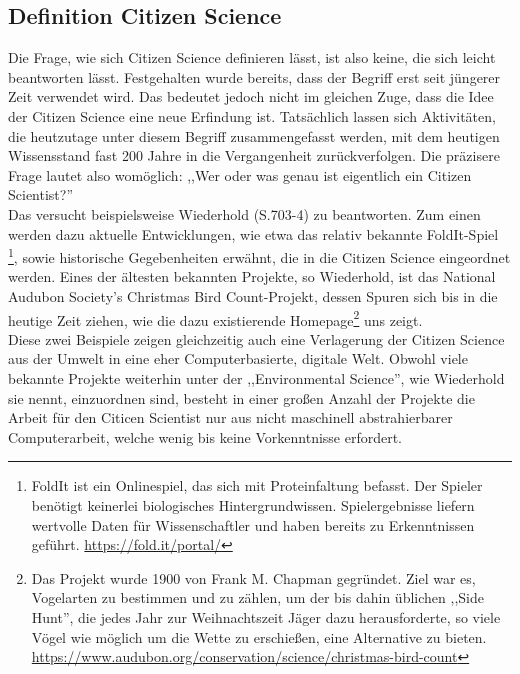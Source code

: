 \documentclass{article}
\begin{document}
\subsection{Definition Citizen Science}
Die Frage, wie sich Citizen Science definieren lässt, ist also keine, die sich leicht beantworten lässt. Festgehalten wurde bereits, dass der Begriff erst seit jüngerer Zeit verwendet wird. Das bedeutet jedoch nicht im gleichen Zuge, dass die Idee der Citizen Science eine neue Erfindung ist. Tatsächlich lassen sich Aktivitäten, die heutzutage unter diesem Begriff zusammengefasst werden, mit dem heutigen Wissensstand fast 200 Jahre in die Vergangenheit zurückverfolgen. Die präzisere Frage lautet also womöglich: ,,Wer oder was genau ist eigentlich ein Citizen Scientist?'' \\
Das versucht beispielsweise Wiederhold\cite{Wiederhold} (S.703-4) zu beantworten. Zum einen werden dazu aktuelle Entwicklungen, wie etwa das relativ bekannte FoldIt-Spiel \footnote{FoldIt ist ein Onlinespiel, das sich mit Proteinfaltung befasst. Der Spieler benötigt keinerlei biologisches Hintergrundwissen. Spielergebnisse liefern wertvolle Daten für Wissenschaftler und haben bereits zu Erkenntnissen geführt. \url{https://fold.it/portal/}}, sowie historische Gegebenheiten erwähnt, die in die Citizen Science eingeordnet werden. Eines der ältesten bekannten Projekte, so Wiederhold, ist das National Audubon Society's Christmas Bird Count-Projekt, dessen Spuren sich bis in die heutige Zeit ziehen, wie die dazu existierende Homepage\footnote{Das Projekt wurde 1900 von Frank M. Chapman gegründet. Ziel war es, Vogelarten zu bestimmen und zu zählen, um der bis dahin üblichen ,,Side Hunt'', die jedes Jahr zur Weihnachtszeit Jäger dazu herausforderte, so viele Vögel wie möglich um die Wette zu erschießen, eine Alternative zu bieten. \url{https://www.audubon.org/conservation/science/christmas-bird-count}} uns zeigt.\\
Diese zwei Beispiele zeigen gleichzeitig auch eine Verlagerung der Citizen Science aus der Umwelt in eine eher Computerbasierte, digitale Welt. Obwohl viele bekannte Projekte weiterhin unter der ,,Environmental Science'', wie Wiederhold sie nennt, einzuordnen sind, besteht in einer großen Anzahl der Projekte die Arbeit für den Citicen Scientist nur aus nicht maschinell abstrahierbarer Computerarbeit, welche wenig bis keine Vorkenntnisse erfordert.\\
\end{document}
